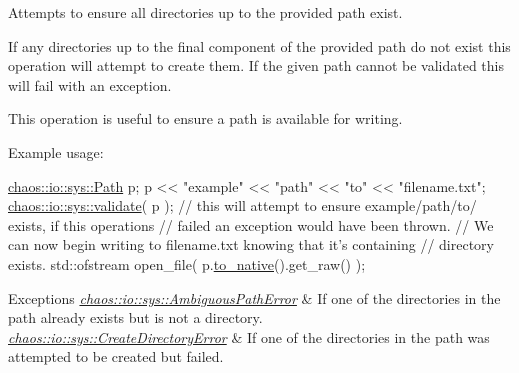 Attempts to ensure all directories up to the provided path exist. 

If any directories up to the final component of the provided path do not exist this operation will attempt to create them. If the given path cannot be validated this will fail with an exception.

This operation is useful to ensure a path is available for writing.

Example usage\-:


\begin{DoxyCode}
\hyperlink{classchaos_1_1io_1_1sys_1_1_path}{chaos::io::sys::Path} p;
p << \textcolor{stringliteral}{"example"} << \textcolor{stringliteral}{"path"} << \textcolor{stringliteral}{"to"} << \textcolor{stringliteral}{"filename.txt"};
\hyperlink{namespacechaos_1_1io_1_1sys_a15e20b105c40cf4d73b13afe87ce1781}{chaos::io::sys::validate}( p );
\textcolor{comment}{// this will attempt to ensure example/path/to/ exists, if this operations}
\textcolor{comment}{// failed an exception would have been thrown.}
\textcolor{comment}{// We can now begin writing to filename.txt knowing that it's containing}
\textcolor{comment}{// directory exists.}
std::ofstream open\_file( p.\hyperlink{classchaos_1_1io_1_1sys_1_1_path_a9528370d2e3ab277a7e71a93469bbc45}{to\_native}().get\_raw() );
\end{DoxyCode}



\begin{DoxyExceptions}{Exceptions}
{\em \hyperlink{classchaos_1_1io_1_1sys_1_1_ambiguous_path_error}{chaos\-::io\-::sys\-::\-Ambiguous\-Path\-Error}} & If one of the directories in the path already exists but is not a directory. \\
\hline
{\em \hyperlink{classchaos_1_1io_1_1sys_1_1_create_directory_error}{chaos\-::io\-::sys\-::\-Create\-Directory\-Error}} & If one of the directories in the path was attempted to be created but failed. \\
\hline
\end{DoxyExceptions}

